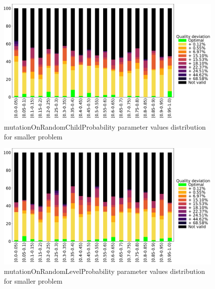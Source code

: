 \begin{figure}
	\centering
	\includegraphics[width=\textwidth]{images/DistrObj/mutationOnRandomChildProbability.pdf}
	\caption[mutationOnRandomChildProbability parameter values distribution for smaller problem]{mutationOnRandomChildProbability parameter values distribution for smaller problem}
	\label{fig:mutationOnRandomChildProbability_Obj}
\end{figure}
\begin{figure}
	\centering
	\includegraphics[width=\textwidth]{images/DistrObj/mutationOnRandomLevelProbability.pdf}
	\caption[mutationOnRandomLevelProbability parameter values distribution for smaller problem]{mutationOnRandomLevelProbability parameter values distribution for smaller problem}
	\label{fig:mutationOnRandomLevelProbability_Obj}
\end{figure}

